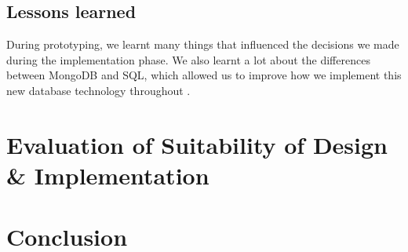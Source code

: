 \documentclass[11pt]{article}
\begin{document}
	\subsection{Lessons learned}
		During prototyping, we learnt many things that influenced the decisions we made during the implementation phase.
		We also learnt a lot about the differences between MongoDB and SQL, which allowed us to improve how we implement this new database technology throughout \opendc{}.

\section{Evaluation of Suitability of Design \& Implementation}


\section{Conclusion} \label{sec:conclusion}


\newpage


\end{document}
